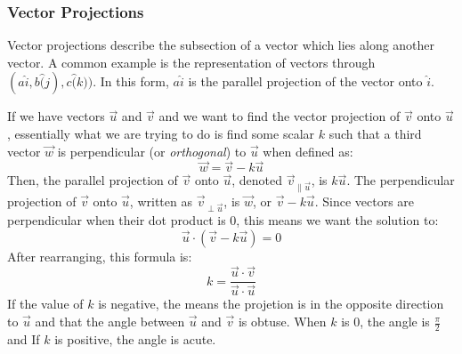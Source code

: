 \documentclass[12pt]{report}
\begin{document}
\begin{flushleft}
\subsubsection*{Vector Projections}
Vector projections describe the subsection of a vector which lies along another
vector. A common example is the representation of vectors through \((a\hat{i},
b\hat(j), c\hat(k))\). In this form, \(a\hat{i}\) is the parallel projection of
the vector onto \(\hat{i}\).

\bigskip
If we have vectors \(\vec{u}\) and \(\vec{v}\) and we want to find the vector
projection of \(\vec{v}\) onto \(\vec{u}\), essentially what we are trying to
do is find some scalar \(k\) such that a third vector \(\vec{w}\) is 
perpendicular (or \textit{orthogonal}) to \(\vec{u}\) when defined as:
\[\vec{w} = \vec{v} - k\vec{u}\]
Then, the parallel projection of \(\vec{v}\) onto \(\vec{u}\), denoted 
\(\vec{v}_{\parallel \vec{u}}\), is \(k\vec{u}\). The perpendicular 
projection of \(\vec{v}\) onto \(\vec{u}\), written as 
\(\vec{v}_{\perp \vec{u}}\), is \(\vec{w}\), or \(\vec{v} - k\vec{u}\).
Since vectors are perpendicular when their dot product is \(0\), this means
we want the solution to:
\[\vec{u}\cdot(\vec{v} - k\vec{u}) = 0\]
After rearranging, this formula is:
\[k = \frac{\vec{u}\cdot\vec{v}}{\vec{u}\cdot\vec{u}}\]
If the value of \(k\) is negative, the means the projetion is in the opposite
direction to \(\vec{u}\) and that the angle between \(\vec{u}\) and \(\vec{v}\)
is obtuse. When \(k\) is \(0\), the angle is \(\frac{\pi}{2}\) and If \(k\) is 
positive, the angle is acute.  


\end{flushleft}
\end{document}
